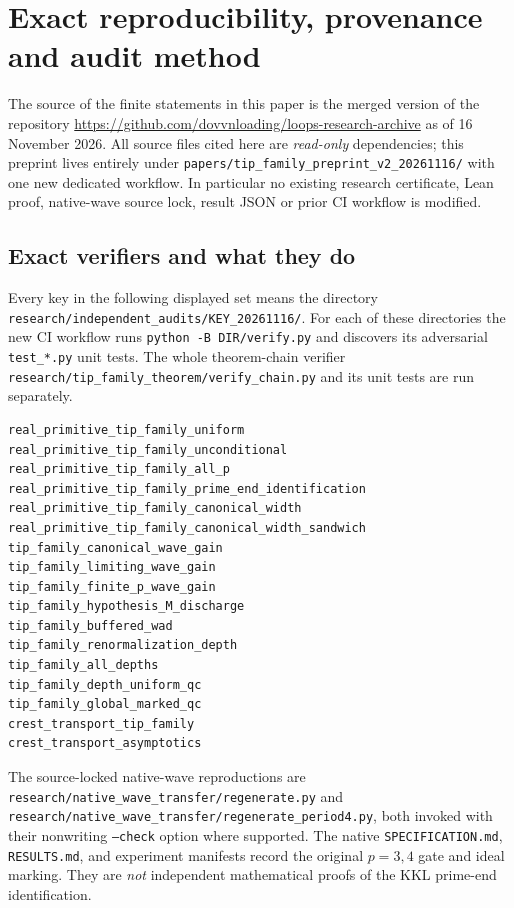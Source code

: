 \section{Exact reproducibility, provenance and audit method}
\label{sec:reproduce}
The source of the finite statements in this
paper is the merged version of the repository
\url{https://github.com/dovvnloading/loops-research-archive}
as of 16 November 2026.
All source files cited here are \emph{read-only}
dependencies; this preprint lives entirely
under \texttt{papers/tip\_family\_preprint\_v2\_20261116/}
with one new dedicated workflow.
In particular no existing research
certificate, Lean proof, native-wave
source lock, result JSON or prior
CI workflow is modified.

\subsection{Exact verifiers and what they do}
Every key in the following displayed set
means the directory
\texttt{research/independent\_audits/KEY\_20261116/}.
For each of these directories the
new CI workflow runs
\texttt{python -B DIR/verify.py}
and discovers its adversarial
\texttt{test\_*.py} unit tests.
The whole theorem-chain verifier
\texttt{research/tip\_family\_theorem/verify\_chain.py}
and its unit tests are run separately.
\begingroup\fontsize{7}{8.5}\selectfont
\begin{verbatim}
real_primitive_tip_family_uniform
real_primitive_tip_family_unconditional
real_primitive_tip_family_all_p
real_primitive_tip_family_prime_end_identification
real_primitive_tip_family_canonical_width
real_primitive_tip_family_canonical_width_sandwich
tip_family_canonical_wave_gain
tip_family_limiting_wave_gain
tip_family_finite_p_wave_gain
tip_family_hypothesis_M_discharge
tip_family_buffered_wad
tip_family_renormalization_depth
tip_family_all_depths
tip_family_depth_uniform_qc
tip_family_global_marked_qc
crest_transport_tip_family
crest_transport_asymptotics
\end{verbatim}
\endgroup
The source-locked native-wave
reproductions are
\texttt{research/native\_wave\_transfer/regenerate.py}
and
\texttt{research/native\_wave\_transfer/regenerate\_period4.py},
both invoked with their
nonwriting \texttt{--check} option
where supported.  The
native \texttt{SPECIFICATION.md},
\texttt{RESULTS.md},
and experiment manifests
record the original
$p=3,4$ gate and
ideal marking.  They
are \emph{not} independent
mathematical proofs of
the KKL prime-end
identification.

